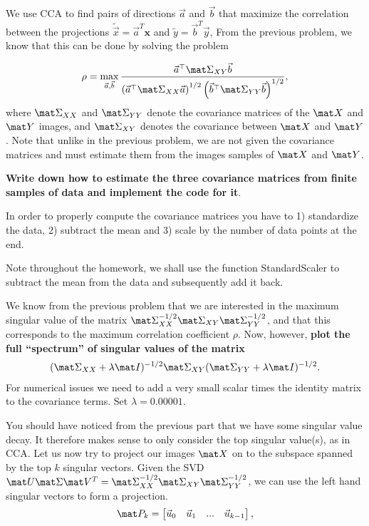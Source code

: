 \documentclass[preview]{standalone}
\begin{document}
\begin{Parts}
\Part We use CCA to find pairs of directions $\vec a$ and $\vec b$
that maximize the correlation between the projections $\tilde{\vec x} = \vec a^T\mathbf{x}$ and $\tilde{y} = \vec b^T\vec{y}$,  From the previous problem, we know that this can be done by solving the problem 

\begin{align*}
	\rho = \max_{\vec a, \vec b} \frac{\vec a^\top \mat \Sigma_{XY} \vec b}{ \left( \vec a^\top \mat \Sigma_{XX} \vec a\right)^{1/2} \left( \vec b^\top \mat \Sigma_{YY} \vec b\right)^{1/2} },
\end{align*}
where $\mat \Sigma_{XX}$ and $\mat \Sigma_{YY}$ denote the covariance matrices
of the $\mat X$ and $\mat Y$ images, and $\mat \Sigma_{XY}$ denotes the covariance
between $\mat X$ and $\mat Y$. Note that unlike in the previous problem, we are not given the covariance matrices and must estimate them from the images samples of $\mat X$ and  $\mat Y$.

{\bf Write down how to estimate the three covariance matrices from finite samples of data and implement the code for it}.

In order to properly compute the covariance matrices you have to 1) standardize the data, 2) subtract the mean and 3) scale by the number of data points at the end. 

Note throughout the homework, we shall use the function StandardScaler to subtract the mean from the data and subsequently add it back. 





\Part We know from the previous problem that we are interested in the
maximum singular value of the matrix $\mat \Sigma_{XX}^{-1/2} \mat \Sigma_{XY}
\mat \Sigma_{YY}^{-1/2}$, and that this corresponds to the maximum correlation coefficient $\rho$. 
Now, however, {\bf plot the full ``spectrum'' of singular values of the matrix} 
\begin{align*}
	(\mat \Sigma_{XX}+\lambda \mat I)^{-1/2} \mat \Sigma_{XY} (\mat \Sigma_{YY}+\lambda \mat I)^{-1/2}.
\end{align*}
For numerical issues we need to add a very small scalar times the identity matrix to the covariance terms. 
Set $\lambda = 0.00001$. 





\Part You should have noticed from the previous part that we have some singular value decay. 
It therefore makes sense to only consider the top singular value(s), as in CCA. 
Let us now try to project our images $\mat X$ on to the subspace spanned by the top $k$ singular vectors. 
Given the SVD $\mat U\mat \Sigma \mat V^T = \mat \Sigma_{XX}^{-1/2} \mat \Sigma_{XY} \mat \Sigma_{YY}^{-1/2}$, we can use the left hand singular vectors to form a projection.  
\[ \mat P_k = \begin{bmatrix}
   \vec u_0   & \vec u_1 & ... & \vec u_{k-1} \\
\end{bmatrix},   \]


\end{Parts}
\end{document}
